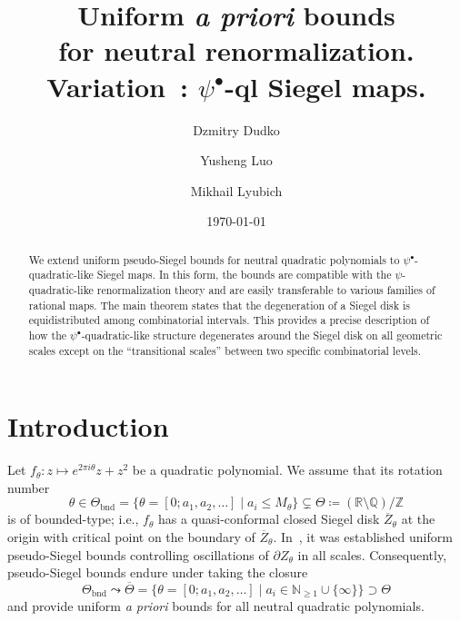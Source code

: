 \documentclass{amsart}
\newcommand{\1}{{\mathbb 1 }}
\newcommand{\Q}{\mathbb{Q}}
\newcommand{\R}{\mathbb{R}}
\newcommand{\N}{\mathbb{N}}
\newcommand{\Z}{\mathbb{Z}}
\theoremstyle{remark}
\numberwithin{equation}{section}
\theoremstyle{definition}
\newcommand{\bnd}{{\mathrm{bnd}}}
\newcommand{\RN}[1]{\MakeUppercase{\romannumeral#1}}%
\begin{document}
\title[Uniform \emph{a priori} bounds for $\psi^\bullet$-ql Siegel maps]{Uniform \emph{a priori} bounds  \\ for neutral renormalization.\\ Variation~\RN{2}: $\psi^\bullet$-ql Siegel maps.}
\author{Dzmitry Dudko}
\author{Yusheng Luo}
\author{Mikhail Lyubich}


\date{\today}
\begin{abstract}
We extend uniform pseudo-Siegel bounds for neutral quadratic polynomials to $\psi^\bullet$-quadratic-like Siegel maps. In this form, the bounds are compatible with the $\psi$-quadratic-like renormalization theory and are easily transferable to various families of rational maps. 
The main theorem states that the degeneration of a Siegel disk is equidistributed among combinatorial intervals. This provides a precise description of how the $\psi^\bullet$-quadratic-like structure degenerates around the Siegel disk on all geometric scales except on the ``transitional scales'' between two specific combinatorial levels.
\end{abstract}
\maketitle



\setcounter{tocdepth}{1}




\tableofcontents


 
\section{Introduction}\label{apendixp:C} Let  $f_\theta: z\mapsto e^{2\pi i \theta} z + z^2$ be a quadratic polynomial. We assume that its rotation number 
\[\theta\in \Theta_\bnd=\{\theta=[0;a_1,a_2,\dots] \mid a_i \le M_\theta\}\subsetneq \Theta\coloneqq  (\R\setminus \Q)/\Z\]
 is of bounded-type; i.e., $f_\theta$ has a quasi-conformal closed Siegel disk $\overline Z_\theta$ at the origin with critical point on the boundary of $\overline Z_\theta$. In~\cite{DL22}, it was established uniform pseudo-Siegel bounds controlling oscillations of $\partial Z_\theta$ in all scales. Consequently, pseudo-Siegel bounds endure under taking the closure \[\Theta_\bnd \leadsto \overline \Theta= \{\theta= [0;a_1,a_2,\dots] \mid a_i \in \N_{\ge 1}\cup \{\infty\}\}\supset \Theta\] and provide uniform \emph{a priori} bounds for all neutral quadratic polynomials.
\end{document}
